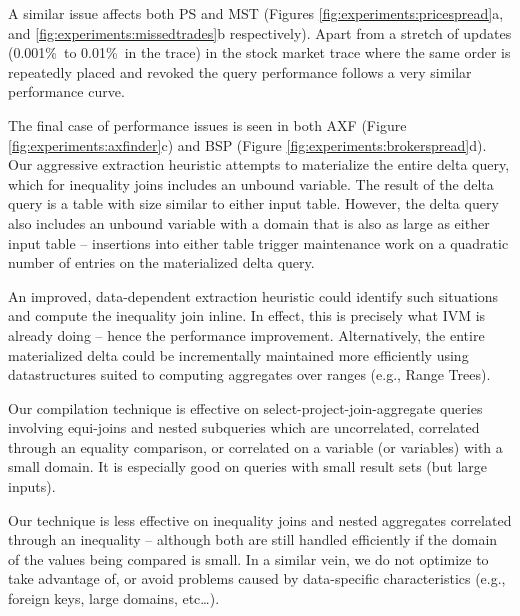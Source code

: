 A similar issue affects both PS and MST (Figures \ref{fig:experiments:pricespread}a, and \ref{fig:experiments:missedtrades}b respectively).  Apart from a stretch of updates (0.001\%\ to 0.01\%\ in the trace) in the stock market trace where the same order is repeatedly placed and revoked the query performance follows a very similar performance curve. 

The final case of performance issues is seen in both AXF (Figure \ref{fig:experiments:axfinder}c) and BSP (Figure \ref{fig:experiments:brokerspread}d).  Our aggressive extraction heuristic attempts to materialize the entire delta query, which for inequality joins includes an unbound variable.  The result of the delta query is a table with size similar to either input table.  However, the delta query also includes an unbound variable with a domain that is also as large as either input table -- insertions into either table trigger maintenance work on a quadratic number of entries on the materialized delta query.  

An improved, data-dependent extraction heuristic could identify such situations and compute the inequality join inline.  In effect, this is precisely what IVM is already doing -- hence the performance improvement.  Alternatively, the entire materialized delta could be incrementally maintained more efficiently using datastructures suited to computing aggregates over ranges (e.g., Range Trees\cite{range trees}).


Our compilation technique is effective on select-project-join-aggregate queries involving equi-joins and nested subqueries which are uncorrelated, correlated through an equality comparison, or correlated on a variable (or variables) with a small domain.  It is especially good on queries with small result sets (but large inputs).

Our technique is less effective on inequality joins and nested aggregates correlated through an inequality -- although both are still handled efficiently if the domain of the values being compared is small.  In a similar vein, we do not optimize to take advantage of, or avoid problems caused by data-specific characteristics (e.g., foreign keys, large domains, etc\ldots). 


